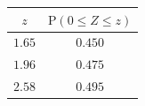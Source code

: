 {\setlength{\tabcolsep}{5pt}\renewcommand{\arraystretch}{1.25}%
\begin{tabular}{|c|c|}
\hline
$z$ & $\mathrm{P}(0\le Z\le z)$ \\
\hline
$1.65$ & $0.450$ \\
\hline
$1.96$ & $0.475$ \\
\hline
$2.58$ & $0.495$ \\
\hline
\end{tabular}}
